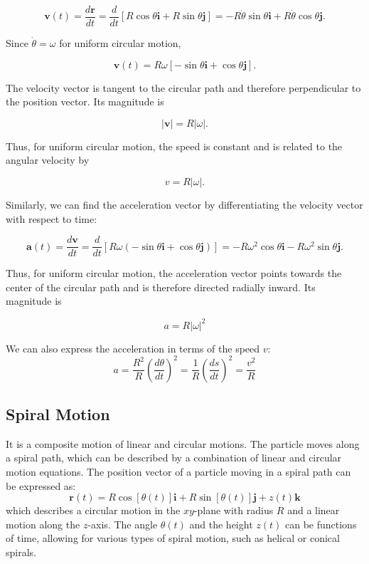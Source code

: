 \documentclass[../main.tex]{subfiles}
\theoremstyle{remark}
\begin{document}
\begin{equation}
\mathbf{v}(t) = \frac{d\mathbf{r}}{dt}
=
\frac{d}{dt}
\left[
R\cos\theta\mathbf{i}
+
R\sin\theta\mathbf{j}
\right]
=
-R\dot{\theta}\sin\theta\mathbf{i}
+
R\dot{\theta}\cos\theta\mathbf{j}.
\end{equation}

Since $\dot{\theta}=\omega$ for uniform circular motion,

\begin{equation}
\mathbf{v}(t)
=
R\omega
\left[
-\sin\theta\mathbf{i}
+
\cos\theta\mathbf{j}
\right].
\end{equation}

The velocity vector is tangent to the circular path and therefore perpendicular to the position vector. Its magnitude is

$$
|\mathbf{v}|=R|\omega|.
$$

Thus, for uniform circular motion, the speed is constant and is related to the angular velocity by

$$
v=R|\omega|.
$$

Similarly, we can find the acceleration vector by differentiating the velocity vector with respect to time:

\begin{equation}
\mathbf{a}(t) = \frac{d\mathbf{v}}{dt}
=
\frac{d}{dt}
\left[
R\omega
\left(
-\sin\theta\mathbf{i}
+
\cos\theta\mathbf{j}
\right)
\right]
=
-R\omega^2\cos\theta\mathbf{i}
-
R\omega^2\sin\theta\mathbf{j}.
\end{equation}

Thus, for uniform circular motion, the acceleration vector points towards the center of the circular path and is therefore directed radially inward. Its magnitude is

\begin{equation}
a=R|\omega|^2 
\end{equation}

We can also express the acceleration in terms of the speed $v$:
\begin{equation}
a  = \frac{R^2}{R} \left(\frac{d\theta}{dt}\right)^2 = \frac{1}{R} \left(\frac{ds}{dt}\right)^2 = \frac{v^2}{R}
\end{equation}


\subsection{Spiral Motion}

It is a composite motion of linear and circular motions. The particle moves along a spiral path, which can be described by a combination of linear and circular motion equations. The position vector of a particle moving in a spiral path can be expressed as:
\[
\mathbf{r}(t) = R \cos[\theta(t)] \mathbf{i} + R \sin[\theta(t)] \mathbf{j} + z(t) \mathbf{k}
\]
which describes a circular motion in the \(xy\)-plane with radius \(R\) and a linear motion along the \(z\)-axis. The angle \(\theta(t)\) and the height \(z(t)\) can be functions of time, allowing for various types of spiral motion, such as helical or conical spirals.
\end{document}
